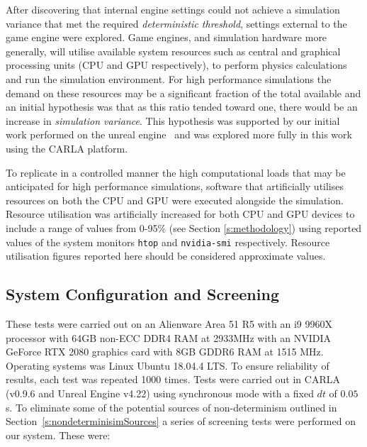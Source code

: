 \documentclass[letterpaper, 10 pt, journal, twoside]{IEEEtran}
\begin{document}
After discovering that internal engine settings could not achieve a simulation variance that met the required \textit{deterministic threshold}, settings external to the game engine were explored. 
%
Game engines, and simulation hardware more generally, will utilise available system resources such as central and graphical processing units (CPU and GPU respectively), to perform physics calculations and run the simulation environment. 
%
For high performance simulations the demand on these resources may be a significant fraction of the total available and an initial hypothesis was that as this ratio tended toward one, there would be an increase in \textit{simulation variance}. This hypothesis was supported by our initial work performed on the unreal engine~\cite{TSLUnrealEngineTesting} and was explored more fully in this work using the CARLA platform.

To replicate in a controlled manner the high computational loads that may be anticipated for high performance simulations, software that artificially utilises resources on both the CPU and GPU were executed alongside the simulation. 
%
Resource utilisation was artificially increased for both CPU and GPU devices to include a range of values from 0-95\% (see Section \ref{s:methodology}) using reported values of the system monitors \texttt{htop} and \texttt{nvidia-smi} respectively. Resource utilisation figures reported here should be considered approximate values.

\subsection{System Configuration and Screening}\label{s:screening}
These tests were carried out on an Alienware Area 51 R5 with an i9 9960X processor with 64GB non-ECC DDR4 RAM at 2933MHz with an NVIDIA GeForce RTX 2080 graphics card with 8GB GDDR6 RAM at 1515 MHz. Operating systems was Linux Ubuntu 18.04.4 LTS. To ensure reliability of results, each test was repeated 1000 times. Tests were carried out in CARLA (v0.9.6 and Unreal Engine v4.22) using synchronous mode with a fixed $dt$ of $0.05$s. To eliminate some of the potential sources of non-determinism outlined in Section~\ref{s:nondeterminisimSources} a series of screening tests were performed on our system. These were:
\end{document}
